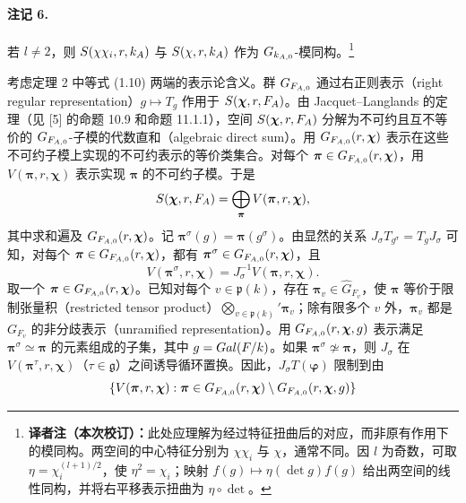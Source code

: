 \paragraph*{注记 6.}
若 $l\ne2$，则 $S(\chi\chi_i,r,k_A)$ 与 $S(\chi,r,k_A)$ 作为 $G_{k_{A,0}}$-模同构。\footnote{\textbf{译者注（本次校订）：}此处应理解为经过特征扭曲后的对应，而非原有作用下的模同构。两空间的中心特征分别为 $\chi\chi_i$ 与 $\chi$，通常不同。因 $l$ 为奇数，可取 $\eta=\chi_i^{(l+1)/2}$，使 $\eta^2=\chi_i$；映射 $f(g)\mapsto\eta(\det g)f(g)$ 给出两空间的线性同构，并将右平移表示扭曲为 $\eta\circ\det$。}

考虑定理 2 中等式 (1.10) 两端的表示论含义。群 $G_{F_{A,0}}$ 通过右正则表示（right regular representation）$g\mapsto T_g$ 作用于 $S(\boldsymbol\chi,r,F_A)$。由 Jacquet--Langlands 的定理（见 [5] 的命题 10.9 和命题 11.1.1），空间 $S(\boldsymbol\chi,r,F_A)$ 分解为不可约且互不等价的 $G_{F_{A,0}}$-子模的代数直和（algebraic direct sum）。用 $G_{F_{A,0}}(r,\boldsymbol\chi)$ 表示在这些不可约子模上实现的不可约表示的等价类集合。对每个 $\boldsymbol\pi\in G_{F_{A,0}}(r,\boldsymbol\chi)$，用 $V(\boldsymbol\pi,r,\boldsymbol\chi)$ 表示实现 $\boldsymbol\pi$ 的不可约子模。于是
\[
 S(\boldsymbol\chi,r,F_A)=\bigoplus_{\boldsymbol\pi}
 V(\boldsymbol\pi,r,\boldsymbol\chi),
\]
其中求和遍及 $G_{F_{A,0}}(r,\boldsymbol\chi)$。记 $\boldsymbol\pi^\sigma(g)=\boldsymbol\pi(g^\sigma)$。由显然的关系 $J_\sigma T_{g^\sigma}=T_gJ_\sigma$ 可知，对每个 $\boldsymbol\pi\in G_{F_{A,0}}(r,\boldsymbol\chi)$，都有 $\boldsymbol\pi^\sigma\in G_{F_{A,0}}(r,\boldsymbol\chi)$，且
\[
 V(\boldsymbol\pi^\sigma,r,\boldsymbol\chi)
 =J_\sigma^{-1}V(\boldsymbol\pi,r,\boldsymbol\chi).
\]
取一个 $\boldsymbol\pi\in G_{F_{A,0}}(r,\boldsymbol\chi)$。已知对每个 $v\in\mathfrak p(k)$，存在 $\boldsymbol\pi_v\in\widehat G_{F_v}$，使 $\boldsymbol\pi$ 等价于限制张量积（restricted tensor product）$\bigotimes_{v\in\mathfrak p(k)}'\boldsymbol\pi_v$；除有限多个 $v$ 外，$\boldsymbol\pi_v$ 都是 $G_{F_v}$ 的非分歧表示（unramified representation）。用 $G_{F_{A,0}}(r,\boldsymbol\chi,g)$ 表示满足 $\boldsymbol\pi^\sigma\simeq\boldsymbol\pi$ 的元素组成的子集，其中 $g=Gal(F/k)$。如果 $\boldsymbol\pi^\sigma\not\simeq\boldsymbol\pi$，则 $J_\sigma$ 在 $V(\boldsymbol\pi^\tau,r,\boldsymbol\chi)$（$\tau\in\mathfrak g$）之间诱导循环置换。因此，$J_\sigma T(\boldsymbol\varphi)$ 限制到由
\[
 \{V(\boldsymbol\pi,r,\boldsymbol\chi):
 \boldsymbol\pi\in G_{F_{A,0}}(r,\boldsymbol\chi)
 \setminus G_{F_{A,0}}(r,\boldsymbol\chi,g)\}
\]
